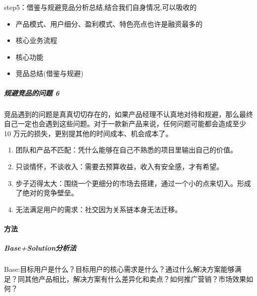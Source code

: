 \documentclass[letterpaper,10pt,english]{sphinxmanual}
\begin{document}
step5：借鉴与规避竞品分析总结,结合我们自身情况,可以吸收的
\begin{itemize}
\item {} 
产品模式、用户细分、盈利模式、特色亮点也许是融资最多的

\item {} 
核心业务流程

\item {} 
核心功能

\item {} 
竞品总结(借鉴与规避)

\end{itemize}


\subparagraph{规避竞品的问题 6\sphinxfootnotemark[531]}
\label{\detokenize{chapter_knowledge/goods_analysis:id23}}%
\begin{footnotetext}[531]\sphinxAtStartFootnote
{}
%
\end{footnotetext}\ignorespaces 
竞品遇到的问题是真真切切存在的，如果产品经理不认真地对待和规避，那么最终自己一定也会遇到这些问题。对于一款新产品来说，任何问题可能都会造成至少
10 万元的损失，更别提其他的时间成本、机会成本了。
\begin{enumerate}
%
\item {} 
团队和产品不匹配：凭什么能够在自己不熟悉的项目里输出自己的价值。

\item {} 
只谈情怀，不谈收入：需要去预算收益，收入有安全感，才有希望。

\item {} 
步子迈得太大：围绕一个更细分的市场去搭建，通过一个小的点来切入。形成了绝对的竞争壁垒。

\item {} 
无法满足用户的需求：社交因为关系链本身无法迁移。

\end{enumerate}


\paragraph{方法}
\label{\detokenize{chapter_knowledge/goods_analysis:id24}}

\subparagraph{Base+Solution分析法}
\label{\detokenize{chapter_knowledge/goods_analysis:base-solution}}
Base:目标用户是什么？目标用户的核心需求是什么？通过什么解决方案能够满足？同其他产品相比，解决方案有什么差异化和卖点？如何推广营销？市场效果如何？
\end{document}
